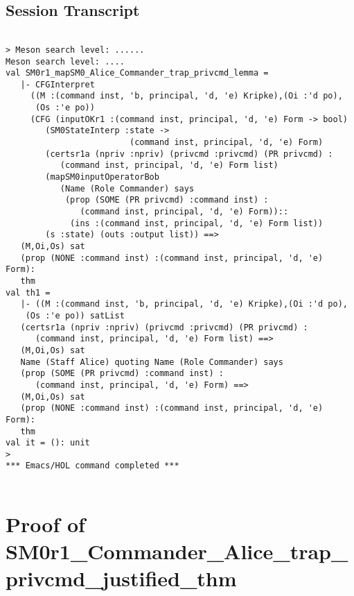 \documentclass{report}
\begin{document}
\subsection{Session Transcript}
\label{trans3}
\begin{session}
  \begin{scriptsize}
\begin{verbatim}

> Meson search level: ......
Meson search level: ....
val SM0r1_mapSM0_Alice_Commander_trap_privcmd_lemma =
   |- CFGInterpret
     ((M :(command inst, 'b, principal, 'd, 'e) Kripke),(Oi :'d po),
      (Os :'e po))
     (CFG (inputOKr1 :(command inst, principal, 'd, 'e) Form -> bool)
        (SM0StateInterp :state ->
                         (command inst, principal, 'd, 'e) Form)
        (certsr1a (npriv :npriv) (privcmd :privcmd) (PR privcmd) :
           (command inst, principal, 'd, 'e) Form list)
        (mapSM0inputOperatorBob
           (Name (Role Commander) says
            (prop (SOME (PR privcmd) :command inst) :
               (command inst, principal, 'd, 'e) Form))::
             (ins :(command inst, principal, 'd, 'e) Form list))
        (s :state) (outs :output list)) ==>
   (M,Oi,Os) sat
   (prop (NONE :command inst) :(command inst, principal, 'd, 'e) Form):
   thm
val th1 =
   |- ((M :(command inst, 'b, principal, 'd, 'e) Kripke),(Oi :'d po),
    (Os :'e po)) satList
   (certsr1a (npriv :npriv) (privcmd :privcmd) (PR privcmd) :
      (command inst, principal, 'd, 'e) Form list) ==>
   (M,Oi,Os) sat
   Name (Staff Alice) quoting Name (Role Commander) says
   (prop (SOME (PR privcmd) :command inst) :
      (command inst, principal, 'd, 'e) Form) ==>
   (M,Oi,Os) sat
   (prop (NONE :command inst) :(command inst, principal, 'd, 'e) Form):
   thm
val it = (): unit
> 
*** Emacs/HOL command completed ***


\end{verbatim}
  \end{scriptsize}
\end{session}

\section{Proof of SM0r1_Commander_Alice_trap_privcmd_justified_thm}
\label{proof-4}
\end{document}
